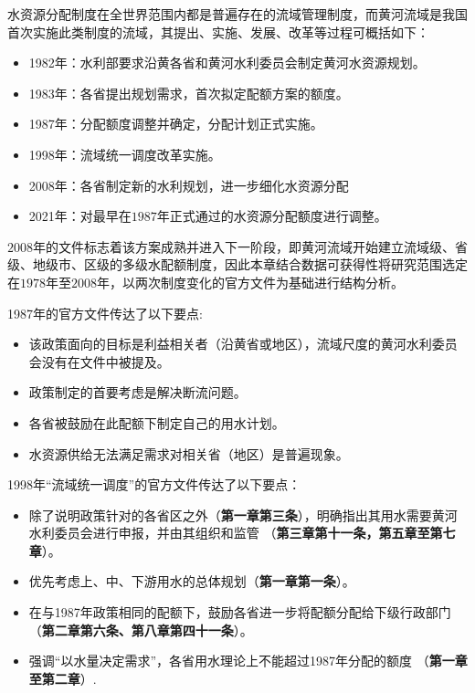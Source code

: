水资源分配制度在全世界范围内都是普遍存在的流域管理制度，而黄河流域是我国首次实施此类制度的流域，其提出、实施、发展、改革等过程可概括如下\cite{wang2019b}：%
\begin{itemize}
    \item 1982年：水利部要求沿黄各省和黄河水利委员会制定黄河水资源规划\cite{wang2019, wang2019a}。
    \item 1983年：各省提出规划需求，首次拟定配额方案的额度。
    \item 1987年：分配额度调整并确定，分配计划正式实施。
    \item 1998年：流域统一调度改革实施。
    \item 2008年：各省制定新的水利规划，进一步细化水资源分配\cite{wang2019,wang2019a}
    \item 2021年：对最早在$1987$年正式通过的水资源分配额度进行调整。
\end{itemize}

$2008$年的文件标志着该方案成熟并进入下一阶段，即黄河流域开始建立流域级、省级、地级市、区级的多级水配额制度，因此本章结合数据可获得性将研究范围选定在$1978$年至$2008$年，以两次制度变化的官方文件为基础进行结构分析。

1987年的官方文件传达了以下要点:

\begin{itemize}
	\item 该政策面向的目标是利益相关者（沿黄省或地区），流域尺度的黄河水利委员会没有在文件中被提及。
	\item 政策制定的首要考虑是解决断流问题。
	\item 各省被鼓励在此配额下制定自己的用水计划。
	\item 水资源供给无法满足需求对相关省（地区）是普遍现象。
\end{itemize}

1998年“流域统一调度”的官方文件传达了以下要点：

\begin{itemize}
	\item 除了说明政策针对的各省区之外（\textbf{第一章第三条}），明确指出其用水需要黄河水利委员会进行申报，并由其组织和监管 （\textbf{第三章第十一条，第五章至第七章}）。
	\item 优先考虑上、中、下游用水的总体规划（\textbf{第一章第一条}）。
	\item 在与1987年政策相同的配额下，鼓励各省进一步将配额分配给下级行政部门（\textbf{第二章第六条、第八章第四十一条}）。
	\item 强调“以水量决定需求”，各省用水理论上不能超过1987年分配的额度 （\textbf{第一章至第二章}）.
\end{itemize}

